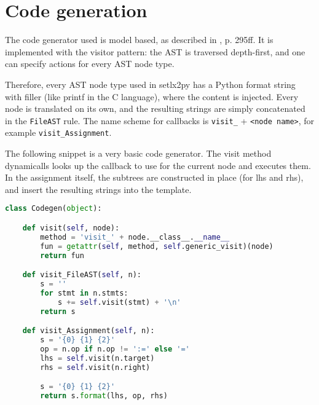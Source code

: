 
\section{Code generation}

The code generator used is model based, as described in \cite{parr2010}{, p. 295ff}. It is implemented with the visitor pattern: the AST is traversed depth-first, and one can specify actions for every AST node type. 

Therefore, every AST node type used in setlx2py has a Python format string with filler (like printf in the C language), where the content is injected. Every node is translated on its own, and the resulting strings are simply concatenated in the \texttt{FileAST} rule. The name scheme for callbacks is \texttt{visit\_} + \texttt{<node name>}, for example \texttt{visit\_Assignment}. 

The following snippet is a very basic code generator. The visit method dynamicalls looks up the callback to use for the current node and executes them. In the assignment itself, the subtrees are constructed in place (for lhs and rhs), and insert the resulting strings into the template.

\begin{lstlisting}[language=python]
class Codegen(object):

    def visit(self, node):
        method = 'visit_' + node.__class__.__name__
        fun = getattr(self, method, self.generic_visit)(node)
        return fun

    def visit_FileAST(self, n):
        s = ''
        for stmt in n.stmts:
            s += self.visit(stmt) + '\n'
        return s

    def visit_Assignment(self, n):
        s = '{0} {1} {2}'
        op = n.op if n.op != ':=' else '='
        lhs = self.visit(n.target)
        rhs = self.visit(n.right)

        s = '{0} {1} {2}'
        return s.format(lhs, op, rhs)
\end{lstlisting}

